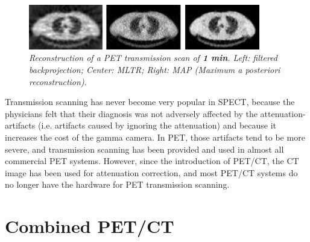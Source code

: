 \begin{figure}[tb]
\centering
\includegraphics[width=0.9\textwidth]{figs/fig_pettranskort.pdf}
\caption{\label{fig:pettranskort} \emph{Reconstruction of a PET transmission
scan of {\bf 1 min}. Left: filtered backprojection; Center: MLTR; Right: MAP
(Maximum a posteriori reconstruction).}}
\end{figure}

Transmission scanning has never become very popular in SPECT, because
the physicians felt that their diagnosis was not adversely affected by
the attenuation-artifacts (i.e. artifacts caused by ignoring the
attenuation) and because it increases the cost of the gamma camera. In
PET, those artifacts tend to be more severe, and transmission scanning
has been provided and used in almost all commercial PET
systems. However, since the introduction of PET/CT, the CT image has
been used for attenuation correction, and most PET/CT systems do no
longer have the hardware for PET transmission scanning.

\section{Combined PET/CT}
